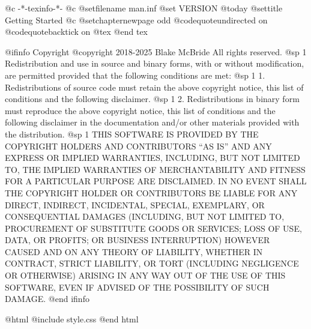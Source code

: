     @c -*-texinfo-*-
@c %
@setfilename man.inf
@set VERSION @today
@settitle Getting Started
@c %
@setchapternewpage odd
@codequoteundirected on
@codequotebacktick on
@tex
\global\def\linkcolor{0 0 1}  %
\global\def\urlcolor{0 0 1}   %
@end tex

@ifinfo
Copyright  @copyright{} 2018-2025 Blake McBride
All rights reserved.
@sp 1
Redistribution and use in source and binary forms, with or without
modification, are permitted provided that the following conditions are
met:
@sp 1
1. Redistributions of source code must retain the above copyright
notice, this list of conditions and the following disclaimer.
@sp 1
2. Redistributions in binary form must reproduce the above copyright
notice, this list of conditions and the following disclaimer in the
documentation and/or other materials provided with the distribution.
@sp 1
THIS SOFTWARE IS PROVIDED BY THE COPYRIGHT HOLDERS AND CONTRIBUTORS
``AS IS'' AND ANY EXPRESS OR IMPLIED WARRANTIES, INCLUDING, BUT NOT
LIMITED TO, THE IMPLIED WARRANTIES OF MERCHANTABILITY AND FITNESS FOR
A PARTICULAR PURPOSE ARE DISCLAIMED. IN NO EVENT SHALL THE COPYRIGHT
HOLDER OR CONTRIBUTORS BE LIABLE FOR ANY DIRECT, INDIRECT, INCIDENTAL,
SPECIAL, EXEMPLARY, OR CONSEQUENTIAL DAMAGES (INCLUDING, BUT NOT
LIMITED TO, PROCUREMENT OF SUBSTITUTE GOODS OR SERVICES; LOSS OF USE,
DATA, OR PROFITS; OR BUSINESS INTERRUPTION) HOWEVER CAUSED AND ON ANY
THEORY OF LIABILITY, WHETHER IN CONTRACT, STRICT LIABILITY, OR TORT
(INCLUDING NEGLIGENCE OR OTHERWISE) ARISING IN ANY WAY OUT OF THE USE
OF THIS SOFTWARE, EVEN IF ADVISED OF THE POSSIBILITY OF SUCH DAMAGE.
@end ifinfo

@html
@include style.css
@end html

